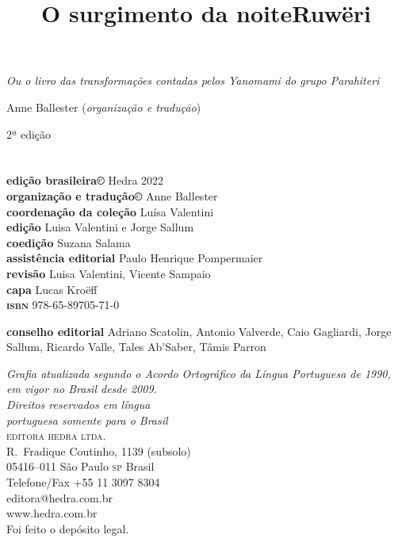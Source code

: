 \title{O surgimento da noite}

\title{Ruwëri}

\textit{Ou o livro das transformações contadas pelos Yanomami do  grupo Parahiteri}

Anne Ballester (\textit{organização e tradução})

2ª edição

\chapter{}

\textbf{edição brasileira©} Hedra 2022\\
\textbf{organização e tradução©} Anne Ballester\\

\textbf{coordenação da coleção} Luísa Valentini\\
\textbf{edição} Luisa Valentini e Jorge Sallum\\
\textbf{coedição} Suzana Salama\\
\textbf{assistência editorial} Paulo Henrique Pompermaier\\
\textbf{revisão} Luisa Valentini, Vicente Sampaio\\
\textbf{capa} Lucas Kroëff\\

\textbf{\textsc{isbn}} 978-65-89705-71-0

\textbf{conselho editorial} Adriano Scatolin, Antonio Valverde, Caio Gagliardi, Jorge Sallum, Ricardo Valle, Tales Ab'Saber, Tâmis Parron

\bigskip
\textit{Grafia atualizada segundo o Acordo Ortográfico da Língua
Portuguesa de 1990, em vigor no Brasil desde 2009.}\\

\vfill
\textit{Direitos reservados em língua\\ 
portuguesa somente para o Brasil}\\

\textsc{editora hedra ltda.}\\
R.~Fradique Coutinho, 1139 (subsolo)\\
05416--011 São Paulo \textsc{sp} Brasil\\
Telefone/Fax +55 11 3097 8304\\\smallskip
editora@hedra.com.br\\
www.hedra.com.br\\

Foi feito o depósito legal.

\chapter{}

